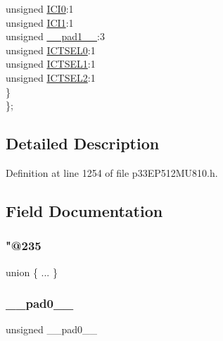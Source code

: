 \begin{DoxyCompactItemize}
\begin{tabbing}
\>\>unsigned \hyperlink{structtag_i_c14_c_o_n1_b_i_t_s_a6f1b5da2706b7c15fc8c9a01a30deaff}{ICI0}:1\\
\>\>unsigned \hyperlink{structtag_i_c14_c_o_n1_b_i_t_s_a7d5c777f0bc43f66f40462f79ed2179c}{ICI1}:1\\
\>\>unsigned \hyperlink{structtag_i_c14_c_o_n1_b_i_t_s_acaf2d0924a107ec6e8d2e31febaf66f9}{\_\_pad1\_\_}:3\\
\>\>unsigned \hyperlink{structtag_i_c14_c_o_n1_b_i_t_s_af6dd4d0e816b18462680d4b22fa926d3}{ICTSEL0}:1\\
\>\>unsigned \hyperlink{structtag_i_c14_c_o_n1_b_i_t_s_aa29140e739d886362537f87d199c4134}{ICTSEL1}:1\\
\>\>unsigned \hyperlink{structtag_i_c14_c_o_n1_b_i_t_s_a47d80892d449e6edbd5ba2ba9ff06deb}{ICTSEL2}:1\\
\>\} \\
\}; \\

\end{tabbing}\end{DoxyCompactItemize}


\subsection{Detailed Description}


Definition at line 1254 of file p33\+E\+P512\+M\+U810.\+h.



\subsection{Field Documentation}
\mbox{\label{structtag_i_c14_c_o_n1_b_i_t_s_aea02484dc80b499ad3673f2269fc9dde}} 
\subsubsection{\texorpdfstring{"@235}{@235}}
{\footnotesize\ttfamily union \{ ... \} }

\mbox{\label{structtag_i_c14_c_o_n1_b_i_t_s_adf71f3d8410c1f1dbbc96680a92c49af}} 
\subsubsection{\texorpdfstring{\+\_\+\+\_\+pad0\+\_\+\+\_\+}{\_\_pad0\_\_}}
{\footnotesize\ttfamily unsigned \+\_\+\+\_\+pad0\+\_\+\+\_\+}



